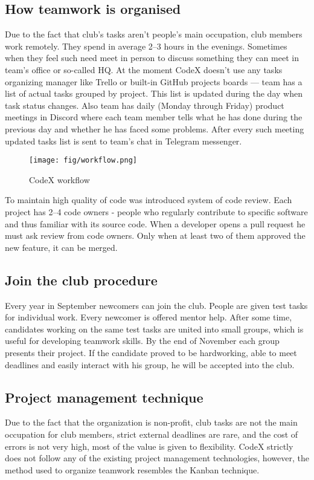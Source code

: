\documentclass[conference]{IEEEtran}
\begin{document}
    \subsection{How teamwork is organised}\label{subsec:how-teamwork-is-organised}
    Due to the fact that club's tasks aren't people's main occupation, club members work remotely.
    They spend in average 2--3 hours in the evenings.
    Sometimes when they feel such need meet in person to discuss something they can meet in team's office or so-called HQ. \newline
    At the moment CodeX doesn't use any tasks organizing manager like Trello or built-in GitHub projects boards — team has a list of actual tasks grouped by project.
    This list is updated during the day when task status changes.
    Also team has daily (Monday through Friday) product meetings in Discord where each team member tells what he has done during the previous day and whether he has faced some problems.
    After every such meeting updated tasks list is sent to team's chat in Telegram messenger.
    \begin{figure}[h!]
        \centering
        \texttt{[image: fig/workflow.png]}
        \caption{CodeX workflow}
        \label{fig:workflow}
    \end{figure}
    \newline
    To maintain high quality of code was introduced system of code review.
    Each project has 2--4 code owners - people who regularly contribute to specific software and thus familiar with its source code.
    When a developer opens a pull request he must ask review from code owners.
    Only when at least two of them approved the new feature, it can be merged.

    \subsection{Join the club procedure}\label{subsec:join-the-club-procedure}
    Every year in September newcomers can join the club.
    People are given test tasks for individual work.
    Every newcomer is offered mentor help.
    After some time, candidates working on the same test tasks are united into small groups, which is useful for developing teamwork skills.
    By the end of November each group presents their project.
    If the candidate proved to be hardworking, able to meet deadlines and easily interact with his group, he will be accepted into the club.

    \subsection{Project management technique}\label{subsec:project-management-technique}
    Due to the fact that the organization is non-profit, club tasks are not the main occupation for club members, strict external deadlines are rare, and the cost of errors is not very high, most of the value is given to flexibility.
    CodeX strictly does not follow any of the existing project management technologies, however, the method used to organize teamwork resembles the Kanban technique.
\end{document}
